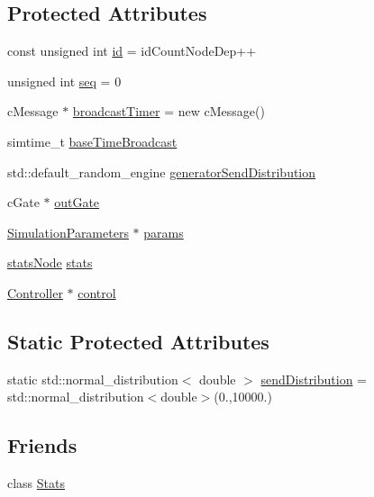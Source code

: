 \subsection*{Protected Attributes}
\begin{DoxyCompactItemize}
\item 
const unsigned int \hyperlink{classNodeBase_a2924723bf530b8304c5e028504aafd84}{id} = id\+Count\+Node\+Dep++
\item 
unsigned int \hyperlink{classNodeBase_a4fe5b1b7aeb49d15ec7986133346aeb7}{seq} = 0
\item 
c\+Message $\ast$ \hyperlink{classNodeBase_a8b7bd31bf2bef92de75a2b565c42fd8a}{broadcast\+Timer} = new c\+Message()
\item 
simtime\+\_\+t \hyperlink{classNodeBase_a199676fc8bd0203c7241f58779c5921c}{base\+Time\+Broadcast}
\item 
std\+::default\+\_\+random\+\_\+engine \hyperlink{classNodeBase_a2c488fd8adf4d208593a6e6eba4d6220}{generator\+Send\+Distribution}
\item 
c\+Gate $\ast$ \hyperlink{classNodeBase_a2e86bd53e181f8b488130032da547f8e}{out\+Gate}
\item 
\hyperlink{classSimulationParameters}{Simulation\+Parameters} $\ast$ \hyperlink{classNodeBase_aa6fb61208e4f5b7a841cd46fac297058}{params}
\item 
\hyperlink{NodeBase_8h_a6d83bdf09c8e309d31f9330091b0d10d}{stats\+Node} \hyperlink{classNodeBase_a12b20bca634637499bf55020c398424e}{stats}
\item 
\hyperlink{classController}{Controller} $\ast$ \hyperlink{classNodeBase_a89bfb79efc25d9508eb15a4184558c41}{control}
\end{DoxyCompactItemize}
\subsection*{Static Protected Attributes}
\begin{DoxyCompactItemize}
\item 
static std\+::normal\+\_\+distribution$<$ double $>$ \hyperlink{classNodeBase_ab8e4cc30083c58d14b22d928a78cb8ac}{send\+Distribution} = std\+::normal\+\_\+distribution$<$double$>$(0.,10000.)
\end{DoxyCompactItemize}
\subsection*{Friends}
\begin{DoxyCompactItemize}
\item 
class \hyperlink{classNodeBase_a129f65b6976377739eb6231b6962985e}{Stats}
\end{DoxyCompactItemize}


